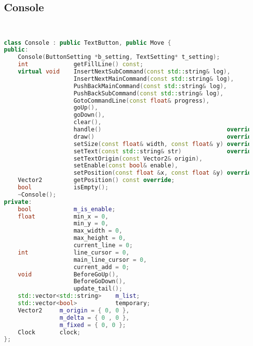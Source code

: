 \subsection{Console}
\begin{lstlisting}[language=C++]


class Console : public TextButton, public Move {
public:
    Console(ButtonSetting *b_setting, TextSetting* t_setting);
    int             getFillLine() const;
    virtual void    InsertNextSubCommand(const std::string& log),
                    InsertNextMainCommand(const std::string& log),
                    PushBackMainCommand(const std::string& log),
                    PushBackSubCommand(const std::string& log),
                    GotoCommandLine(const float& progress),
                    goUp(),
                    goDown(),
                    clear(),
                    handle()                                    override,
                    draw()                                      override,
                    setSize(const float& width, const float& y) override,
                    setText(const std::string& str)             override,
                    setTextOrigin(const Vector2& origin),
                    setEnable(const bool& enable),
                    setPosition(const float &x, const float &y) override;
    Vector2         getPosition() const override;
    bool            isEmpty();
    ~Console();
private:
    bool            m_is_enable;
    float           min_x = 0,
                    min_y = 0,
                    max_width = 0,
                    max_height = 0,
                    current_line = 0;
    int             line_cursor = 0,
                    main_line_cursor = 0,
                    current_add = 0;
    void            BeforeGoUp(),
                    BeforeGoDown(),
                    update_tail();
    std::vector<std::string>    m_list;
    std::vector<bool>           temporary;
    Vector2     m_origin = { 0, 0 },
                m_delta = { 0 , 0 },
                m_fixed = { 0, 0 };
    Clock       clock;
};






\end{lstlisting}
